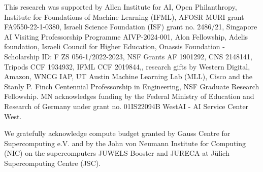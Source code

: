 This research was supported by Allen Institute for AI, Open Philanthropy, Institute for Foundations of Machine Learning (IFML), AFOSR MURI grant FA9550-22-1-0380, Israeli Science Foundation (ISF) grant no. 2486/21, Singapore AI Visiting Professorship Programme AIVP-2024-001, Alon Fellowship, Adelis foundation, Israeli Council for Higher Education, Onassis Foundation - Scholarship ID: F ZS 056-1/2022-2023, NSF Grants AF 1901292, CNS 2148141, Tripods CCF 1934932, IFML CCF 2019844,, research gifts by Western Digital, Amazon, WNCG IAP, UT Austin Machine Learning Lab (MLL), Cisco and the Stanly P. Finch Centennial Professorship in Engineering, NSF Graduate Research Fellowship. MN acknowledges funding by the Federal Ministry of Education and Research of Germany under grant no. 01IS22094B WestAI - AI Service Center West.

We gratefully acknowledge compute budget granted by Gauss Centre for Supercomputing e.V. and by the John von Neumann Institute for Computing (NIC) on the supercomputers JUWELS Booster and JURECA at Jülich Supercomputing Centre (JSC).


